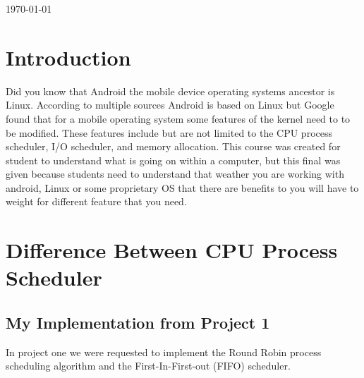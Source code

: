 \documentclass[letterpaper,10pt]{article}
\begin{document}
\begin{titlepage}

{\large \today}\\[3cm] %


 

\vfill %

\end{titlepage}

\tableofcontents
\vfill %
\newpage


\section{Introduction} 
Did you know that Android the mobile device operating systems ancestor is Linux. According to multiple sources Android is based on Linux but Google found that for a mobile operating system some features of the kernel need to to be modified. These features include but are not limited to the CPU process scheduler, I/O scheduler, and memory allocation. This course was created for student to understand what is going on within a computer, but this final was given because students need to understand that weather you are working with android, Linux or some proprietary OS that there are benefits to you will have to weight for different feature that you need. 


\section{Difference Between CPU Process Scheduler} 
\subsection{My Implementation from Project 1}
In project one we were requested to implement the Round Robin process scheduling algorithm and the First-In-First-out (FIFO) scheduler.
\end{document}
